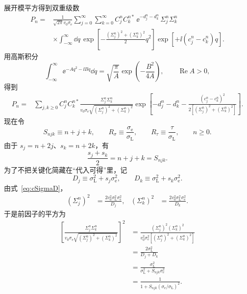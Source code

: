展开模平方得到双重级数
\begin{align}
P_n
={}&\frac{1}{\sqrt{2\pi}v_0\sigma_{\mathrm e}}
\sum_{j=0}^{\infty}\sum_{k=0}^{\infty}
C_j^n C_k^{n*}\,
\ee^{-d_j^n-d_k^n}\,
\Sigma_j^n\Sigma_k^n\\
&\times
\int_{-\infty}^{\infty}\dd q\,
\exp\!\left[-\frac{(\Sigma_j^n)^2+(\Sigma_k^n)^2}{2}q^2\right]
\exp\!\left[+\ii(c_j^n-c_k^n)q\right].
\label{eq:Pk_gaussian_integral}
\end{align}
用高斯积分
\begin{equation}
\int_{-\infty}^{\infty}\ee^{-Aq^2-\ii Bq}\dd q
=\sqrt{\frac{\pi}{A}}\exp\!\left(-\frac{B^2}{4A}\right),
\qquad \operatorname{Re}A>0,
\end{equation}
得到
\begin{align}
P_n
={}&\sum_{j,k\ge0}C_j^nC_k^{n*}
\frac{\Sigma_j^n\Sigma_k^n}
{v_0\sigma_{\mathrm e}\sqrt{(\Sigma_j^n)^2+(\Sigma_k^n)^2}}
\exp\!\left[
-d_j^n-d_k^n
-\frac{(c_j^n-c_k^n)^2}
{2[(\Sigma_j^n)^2+(\Sigma_k^n)^2]}
\right].
\label{eq:Pk_before_simplify}
\end{align}
现在令
\begin{equation}
S_{njk}\equiv n+j+k,
\qquad
R_\sigma\equiv\frac{\sigma_{\mathrm e}}{\sigma_{\mathrm L}},
\qquad
R_\tau\equiv\frac{\tau}{\sigma_{\mathrm L}},
\qquad n\ge0.
\end{equation}
由于
\(s_j=n+2j\)、\(s_k=n+2k\)，有
\begin{equation}
\frac{s_j+s_k}{2}=n+j+k=S_{njk}.
\end{equation}
为了不把关键化简藏在“代入可得”里，记
\[
D_j\equiv \sigma_{\mathrm L}^2+s_j\sigma_{\mathrm e}^2,
\qquad
D_k\equiv \sigma_{\mathrm L}^2+s_k\sigma_{\mathrm e}^2.
\]
由式~\eqref{eq:cSigmaD}，
\begin{align}
(\Sigma_j^n)^2&=\frac{2v_0^2\sigma_{\mathrm L}^2\sigma_{\mathrm e}^2}{D_j},
&
(\Sigma_k^n)^2&=\frac{2v_0^2\sigma_{\mathrm L}^2\sigma_{\mathrm e}^2}{D_k}.
\end{align}
于是前因子的平方为
\begin{align}
\left[
\frac{\Sigma_j^n\Sigma_k^n}
{v_0\sigma_{\mathrm e}\sqrt{(\Sigma_j^n)^2+(\Sigma_k^n)^2}}
\right]^2
&=\frac{(\Sigma_j^n)^2(\Sigma_k^n)^2}
{v_0^2\sigma_{\mathrm e}^2[(\Sigma_j^n)^2+(\Sigma_k^n)^2]}\\
&=\frac{2\sigma_{\mathrm L}^2}{D_j+D_k}\\
&=\frac{\sigma_{\mathrm L}^2}
{\sigma_{\mathrm L}^2+S_{njk}\sigma_{\mathrm e}^2}\\
&=\frac{1}{1+S_{njk}(\sigma_{\mathrm e}/\sigma_{\mathrm L})^2}.
\end{align}
